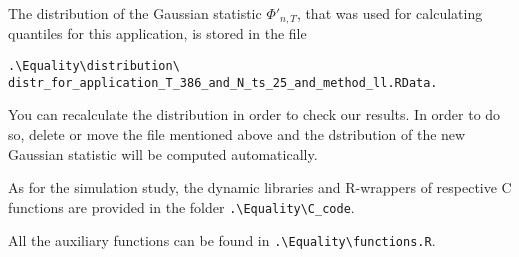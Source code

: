 \documentclass[a4paper,12pt]{article}
\begin{document}
The distribution of the Gaussian statistic $\Phi'_{n, T}$, that was used for calculating quantiles for this application, is stored in the file
\begin{verbatim}
.\Equality\distribution\
distr_for_application_T_386_and_N_ts_25_and_method_ll.RData.
\end{verbatim} You can recalculate the distribution in order to check our results. In order to do so, delete or move the file mentioned above and the dstribution of the new Gaussian statistic will be computed automatically.


As for the simulation study, the dynamic libraries and R-wrappers of respective C functions are provided in the folder \verb|.\Equality\C_code|. 


All the auxiliary functions can be found in \verb|.\Equality\functions.R|.

\end{document}
